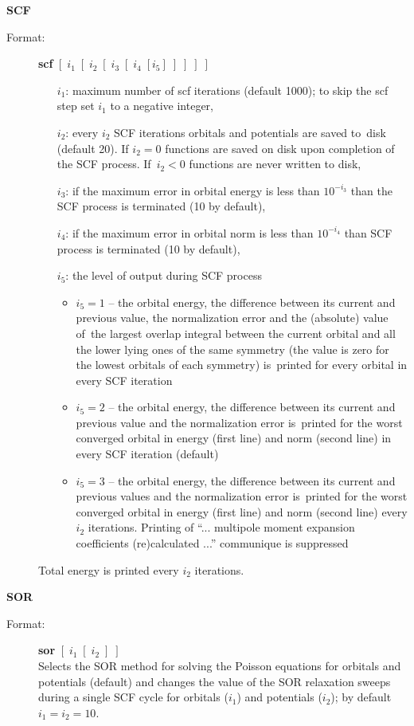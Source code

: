 \documentclass[12pt,a4paper]{article}
\begin{document}
\begin{description}
\item \textbf{SCF}
\begin{description}
\item[Format:] \textbf{scf}
$[\;i_1\;[\;i_2\;[\;i_3\;[\;i_4\;[i_5]\;]\;]\;]\;]$
\begin{itemize}
\item[$i_1$:] maximum number of scf iterations (default 1000); to skip the scf step set
  $i_1$ to a negative integer,
\item[$i_2$:] every $i_2$ SCF iterations orbitals and potentials are saved to~disk
  (default 20).
  If $i_2=0$ functions are saved on disk upon completion of the SCF
  process. If~$i_2<0$ functions are never written to disk,
\item[$i_3$:] if the maximum error in orbital energy is less than $10^{-i_3}$ than the SCF
  process is terminated (10 by default),
\item[$i_4$:] if the maximum error in orbital norm is less than $10^{-i_4}$ than SCF
  process is terminated (10 by default),
\item[$i_5$:] the level of output during SCF process
\begin{itemize}
\item $i_5=1$ -- the orbital energy, the difference between its current and previous
  value, the normalization error and the (absolute) value of~the largest overlap integral
  between the current orbital and all the lower lying ones of the same symmetry (the value
  is zero for the lowest orbitals of each symmetry) is~printed for every orbital in every
  SCF iteration
\item $i_5=2$ -- the orbital energy, the difference between its current and previous value
  and the normalization error is~printed for the worst converged orbital in energy (first
  line) and norm (second line) in every SCF iteration (default)
\item $i_5=3$ -- the orbital energy, the difference between its current and previous values
  and the normalization error is~printed for the worst converged orbital in energy (first
  line) and norm (second line) every $i_2$ iterations. Printing of ``... multipole moment
  expansion coefficients (re)calculated ...''  communique is suppressed
\end{itemize}
\end{itemize}
Total energy is printed every $i_2$ iterations.
\end{description}


\item \textbf{SOR}
\begin{description}
\item[Format:] \textbf{sor} $[\;i_1\;[\;i_2\;]\;]$\\
Selects the SOR method for solving the Poisson equations for orbitals and potentials
(default) and changes the value of the SOR relaxation sweeps during a single SCF
cycle for orbitals ($i_1$) and potentials ($i_2$); by default $i_1=i_2=10$.


\end{description}
\end{description}
\end{document}
